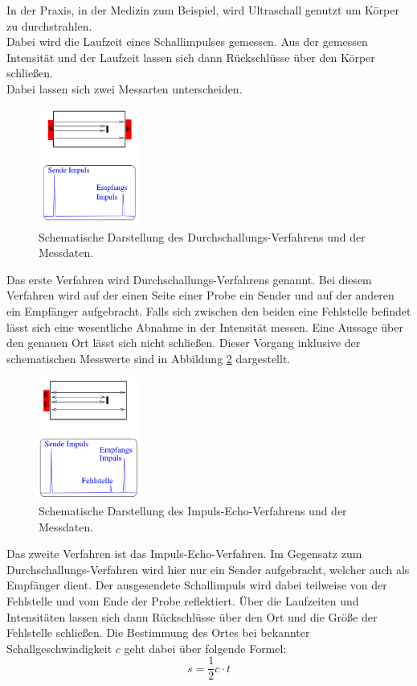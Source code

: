 \noindent
In der Praxis, in der Medizin zum Beispiel, wird Ultraschall genutzt um Körper zu durchstrahlen.\\
Dabei wird die Laufzeit eines Schallimpulses gemessen. Aus der gemessen Intensität und der Laufzeit lassen sich dann Rückschlüsse über den Körper schließen.\\
Dabei lassen sich zwei Messarten unterscheiden.
\begin{figure}[H]
    \centering
    \includegraphics[width=0.3\textwidth]{latex/images/durchschall.PNG}
    \caption{Schematische Darstellung des Durchschallungs-Verfahrens und der Messdaten\protect \cite{US1}.}
    \label{img:durch}
\end{figure}

\noindent
Das erste Verfahren wird Durchschallungs-Verfahrens genannt.
Bei diesem Verfahren wird auf der einen Seite einer Probe ein Sender und auf der anderen ein Empfänger aufgebracht.
Falls sich zwischen den beiden eine Fehlstelle befindet lässt sich eine wesentliche Abnahme in der Intensität messen.
Eine Aussage über den genauen Ort lässt sich nicht schließen. 
Dieser Vorgang inklusive der schematischen Messwerte sind in Abbildung \ref{img:durch} dargestellt.

\begin{figure}[H]
    \centering
    \includegraphics[width=0.3\textwidth]{latex/images/echo.PNG}
    \caption{Schematische Darstellung des Impuls-Echo-Verfahrens und der Messdaten\protect \cite{US1}.}
    \label{img:durch}
\end{figure}

\noindent 
Das zweite Verfahren ist das Impuls-Echo-Verfahren. 
Im Gegensatz zum Durchschallungs-Verfahren wird hier nur ein Sender aufgebracht, welcher auch als Empfänger dient.
Der ausgesendete Schallimpuls wird dabei teilweise von der Fehlstelle und vom Ende der Probe reflektiert. 
Über die Laufzeiten und Intensitäten lassen sich dann Rückschlüsse über den Ort und die Größe der Fehlstelle schließen.
Die Bestimmung des Ortes bei bekannter Schallgeschwindigkeit $c$ geht dabei über folgende Formel:
\begin{equation*}
    s=\frac{1}{2}c \cdot t
\end{equation*}

